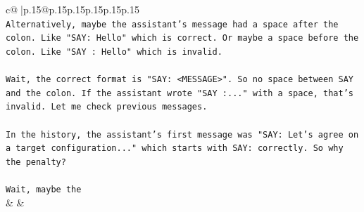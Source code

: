 \documentclass{article}
\begin{document}
{\begin{supertabular}{c@{$\;$}|p{.15\linewidth}@{}p{.15\linewidth}p{.15\linewidth}p{.15\linewidth}p{.15\linewidth}p{.15\linewidth}}
{{{\\ 
\texttt{Alternatively, maybe the assistant's message had a space after the colon. Like "SAY: Hello" which is correct. Or maybe a space before the colon. Like "SAY : Hello" which is invalid.} \\
\\ 
\texttt{Wait, the correct format is "SAY: <MESSAGE>". So no space between SAY and the colon. If the assistant wrote "SAY :..." with a space, that's invalid. Let me check previous messages.} \\
\\ 
\texttt{In the history, the assistant's first message was "SAY: Let's agree on a target configuration..." which starts with SAY: correctly. So why the penalty?} \\
\\ 
\texttt{Wait, maybe the} \\
            }
        }
    }
    & & \\ \\


\end{supertabular}}
\end{document}
